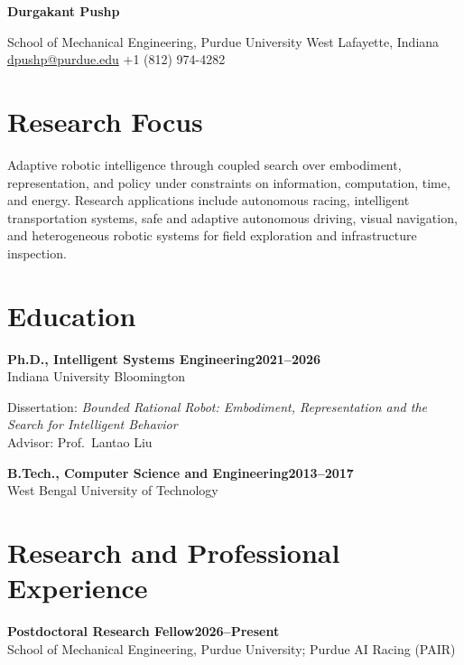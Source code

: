 \documentclass[11pt,letterpaper]{article}
\newcommand{\entry}[3]{
    \Needspace{4\baselineskip}
    \textbf{#1}\hfill\textbf{#2}\\
    #3\par
}
\begin{document}

{\LARGE\bfseries Durgakant Pushp}\par

School of Mechanical Engineering, Purdue University
\hfill West Lafayette, Indiana\\
\href{mailto:dpushp@purdue.edu}{dpushp@purdue.edu}
\hfill +1 (812) 974-4282

\section{Research Focus}

Adaptive robotic intelligence through coupled search over
embodiment, representation, and policy under constraints on
information, computation, time, and energy. Research applications
include autonomous racing, intelligent transportation systems,
safe and adaptive autonomous driving, visual navigation, and
heterogeneous robotic systems for field exploration and
infrastructure inspection.

\section{Education}

\entry{Ph.D., Intelligent Systems Engineering}{2021--2026}
{Indiana University Bloomington}

Dissertation:
\emph{Bounded Rational Robot: Embodiment, Representation and
the Search for Intelligent Behavior}\\
Advisor: Prof.\ Lantao Liu

\entry{B.Tech., Computer Science and Engineering}{2013--2017}
{West Bengal University of Technology}

\section{Research and Professional Experience}

\entry{Postdoctoral Research Fellow}{2026--Present}
{School of Mechanical Engineering, Purdue University;
Purdue AI Racing (PAIR)}
\end{document}
